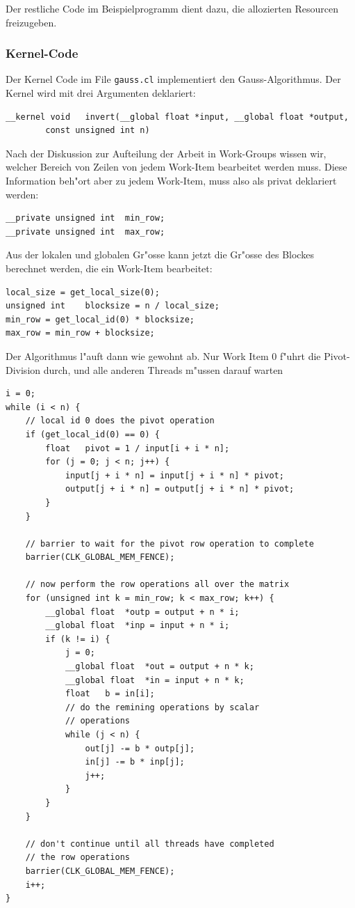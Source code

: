 Der restliche Code im Beispielprogramm dient dazu, die allozierten
Resourcen freizugeben.

\subsubsection{Kernel-Code}
Der Kernel Code im File \verb+gauss.cl+ implementiert den Gauss-Algorithmus.
Der Kernel wird mit drei Argumenten deklariert:
\begin{verbatim}
__kernel void   invert(__global float *input, __global float *output,
        const unsigned int n)
\end{verbatim}
Nach der Diskussion zur Aufteilung der Arbeit in Work-Groups wissen wir,
welcher Bereich von Zeilen von jedem Work-Item bearbeitet werden muss.
Diese Information beh"ort aber zu jedem Work-Item, muss also als 
privat deklariert werden:
\begin{verbatim}
__private unsigned int  min_row;
__private unsigned int  max_row;
\end{verbatim}
Aus der lokalen und globalen Gr"osse kann jetzt die Gr"osse des Blockes
berechnet werden, die ein Work-Item bearbeitet:
\begin{verbatim}
local_size = get_local_size(0);
unsigned int    blocksize = n / local_size;
min_row = get_local_id(0) * blocksize;
max_row = min_row + blocksize;
\end{verbatim}
Der Algorithmus l"auft dann wie gewohnt ab.
Nur Work Item 0 f"uhrt die Pivot-Division durch, und alle anderen
Threads m"ussen darauf warten
\begin{verbatim}
i = 0;
while (i < n) {
    // local id 0 does the pivot operation
    if (get_local_id(0) == 0) {
        float   pivot = 1 / input[i + i * n];
        for (j = 0; j < n; j++) {
            input[j + i * n] = input[j + i * n] * pivot;
            output[j + i * n] = output[j + i * n] * pivot;
        }
    }

    // barrier to wait for the pivot row operation to complete
    barrier(CLK_GLOBAL_MEM_FENCE);

    // now perform the row operations all over the matrix
    for (unsigned int k = min_row; k < max_row; k++) {
        __global float  *outp = output + n * i;
        __global float  *inp = input + n * i;
        if (k != i) {
            j = 0; 
            __global float  *out = output + n * k;
            __global float  *in = input + n * k;
            float   b = in[i];
            // do the remining operations by scalar
            // operations
            while (j < n) {
                out[j] -= b * outp[j];
                in[j] -= b * inp[j];
                j++;
            }
        }
    }

    // don't continue until all threads have completed
    // the row operations
    barrier(CLK_GLOBAL_MEM_FENCE);
    i++;
}
\end{verbatim}

